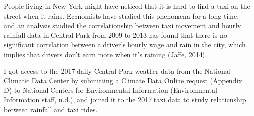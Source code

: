 \documentclass[12pt,twoside]{reedthesis}
\theoremstyle{definition}
\theoremstyle{definition}
\theoremstyle{definition}
\theoremstyle{remark}
\begin{document}
People living in New York might have noticed that it is hard to find a
taxi on the street when it rains. Economists have studied this phenomena
for a long time, and an analysis studied the correlationship between
taxi movement and hourly rainfall data in Central Park from 2009 to 2013
has found that there is no significant correlation between a driver's
hourly wage and rain in the city, which implies that drivers don't earn
more when it's raining (Jaffe, 2014).

I got access to the 2017 daily Central Park weather data from the
National Climatic Data Center by submitting a Climate Data Online
request (Appendix D) to National Centers for Environmental Information
(Environmental Information staff, n.d.), and joined it to the 2017 taxi
data to study relationship between rainfall and taxi rides.
\end{document}
